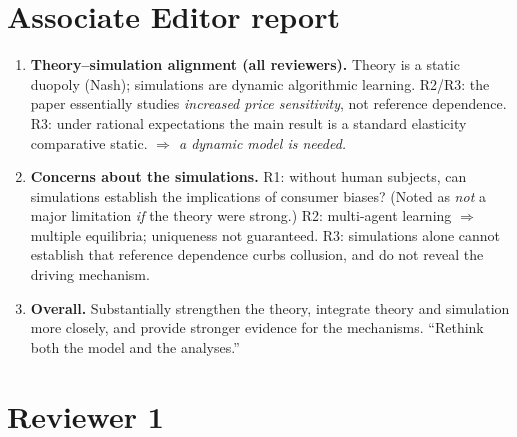 \documentclass[11pt]{article}
\begin{document}
\section{Associate Editor report}

\begin{enumerate}[label=\textbf{AE\arabic*.}]
  \item \textbf{Theory--simulation alignment (all reviewers).} Theory is a static duopoly (Nash);
        simulations are dynamic algorithmic learning. R2/R3: the paper essentially studies
        \emph{increased price sensitivity}, not reference dependence. R3: under rational expectations
        the main result is a standard elasticity comparative static.
        \emph{$\Rightarrow$ a dynamic model is needed.}
  \item \textbf{Concerns about the simulations.} R1: without human subjects, can simulations establish
        the implications of consumer biases? (Noted as \emph{not} a major limitation \emph{if} the
        theory were strong.) R2: multi-agent learning $\Rightarrow$ multiple equilibria; uniqueness not
        guaranteed. R3: simulations alone cannot establish that reference dependence curbs collusion,
        and do not reveal the driving mechanism.
  \item \textbf{Overall.} Substantially strengthen the theory, integrate theory and simulation more
        closely, and provide stronger evidence for the mechanisms. ``Rethink both the model and the
        analyses.''
\end{enumerate}

\section{Reviewer 1}
\end{document}
